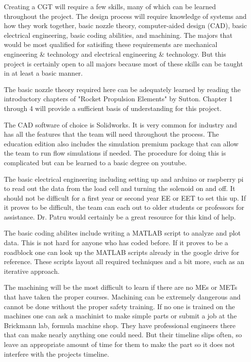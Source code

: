 \documentclass[conference]{IEEEtran} %
\begin{document}
Creating a CGT will require a few skills, many of which can be learned throughout the project. The design process will require knowledge of systems and how they
work together, basic nozzle theory, computer-aided design (CAD), basic electrical engineering, basic coding abilities, and machining. The majors that would
be most qualified for satisifing these requirements are mechanical engineering \& technology and electrical engineering \& technology. But this project is certainly
open to all majors because most of these skills can be taught in at least a basic manner.

The basic nozzle theory required here can be adequately learned by reading the introductory chapters of "Rocket Propulsion Elements" by Sutton. Chapter 1 through 4 will
provide a sufficient basis of understanding for this project.

 The CAD software of choice is Solidworks. It is very common for industry and has all the features that the team
will need throughout the process. The education edition also includes the simulation premium package that can allow the team to run flow simulations if needed. The procedure for
doing this is complicated but can be learned to a basic degree on youtube.

The basic electrical engineering including setting up and arduino or raspberry pi to read out the data from the load cell and turning the solenoid on and off. It
should not be difficult for a first year or second year EE or EET to set this up. If it proves to be difficult, the team can each out to older students or professors for assistance.
Dr. Patru would certainly be a great resource for this kind of help.

The basic coding abilites include writing a MATLAB script to analyze and plot data. This is not hard for anyone who has coded before. If it proves to be a roadblock
one can look up the MATLAB scripts already in the google drive for reference. These scripts layout all required techniques and a bit more, such as an iterative approach.

The machining will be the most difficult to learn if there are no MEs or METs that have taken the proper courses. Machining can be extremely dangerous and cannot be done
without the proper safety training. If no one is trained on the machines one can ask a machinist to make simple parts or submit a job at the Brickmann lab, formula machine shop.
They have professional engineers there that can make nearly anything one could need. But their timeline slips often, so leave an appropriate amount of time for them to make the part
so it does not interfere with the projects timeline.
\end{document}
